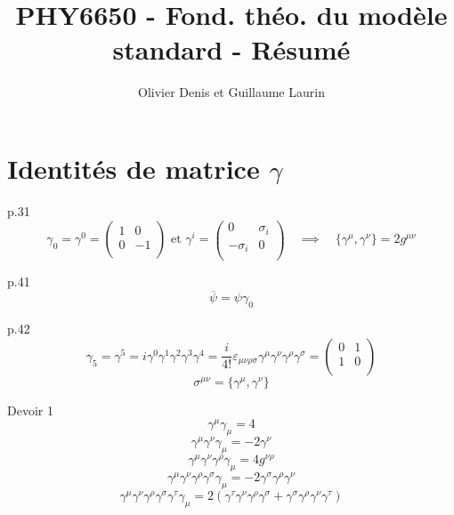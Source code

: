 \documentclass[12pt]{article}
\begin{document}
\title{PHY6650 - Fond. théo. du modèle standard - Résumé}
\author{Olivier Denis et Guillaume Laurin}
\maketitle
\newpage

\section{Identités de matrice $\gamma$}
p.31\\
\begin{equation}
  \gamma_0 = \gamma^0 = \begin{pmatrix}
    1 & 0 \\
    0 & -1\\
\end{pmatrix} \text{  et   } \gamma^i = \begin{pmatrix}
  0 & \sigma_i \\
  -\sigma_i & 0\\
\end{pmatrix} \quad \implies \quad \{\gamma^\mu, \gamma^\nu\} = 2 g^{\mu\nu}
\end{equation}

p.41 \\
\begin{equation}
  \overline{\psi} = \psi\gamma_0
\end{equation}

p.42 \\
\begin{equation}
  \gamma_5 = \gamma^5 = i\gamma^0\gamma^1\gamma^2\gamma^3\gamma^4 = \frac{i}{4!}\varepsilon_{\mu\nu\rho\sigma}\gamma^\mu\gamma^\nu\gamma^\rho\gamma^\sigma=\begin{pmatrix}0 & 1 \\ 1 & 0\\
\end{pmatrix}
\end{equation}
\begin{equation}
  \sigma^{\mu\nu} = \{\gamma^\mu,\gamma^\nu\}
\end{equation}

Devoir 1 \\
\begin{equation}
  \gamma^\mu\gamma_\mu = 4
\end{equation}
\begin{equation}
  \gamma^\mu\gamma^\nu\gamma_\mu = -2\gamma^\nu
\end{equation}
\begin{equation}
  \gamma^\mu\gamma^\nu\gamma^\rho\gamma_\mu = 4g^{\nu\rho}
\end{equation}
\begin{equation}
  \gamma^\mu\gamma^\nu\gamma^\rho\gamma^\sigma\gamma_\mu = -2\gamma^\sigma\gamma^\rho\gamma^\nu
\end{equation}
\begin{equation}
  \gamma^\mu\gamma^\nu\gamma^\rho\gamma^\sigma\gamma^\tau\gamma_\mu = 2(\gamma^\tau\gamma^\nu\gamma^\rho\gamma^\sigma + \gamma^\sigma\gamma^\rho\gamma^\nu\gamma^\tau)
\end{equation}
\end{document}
